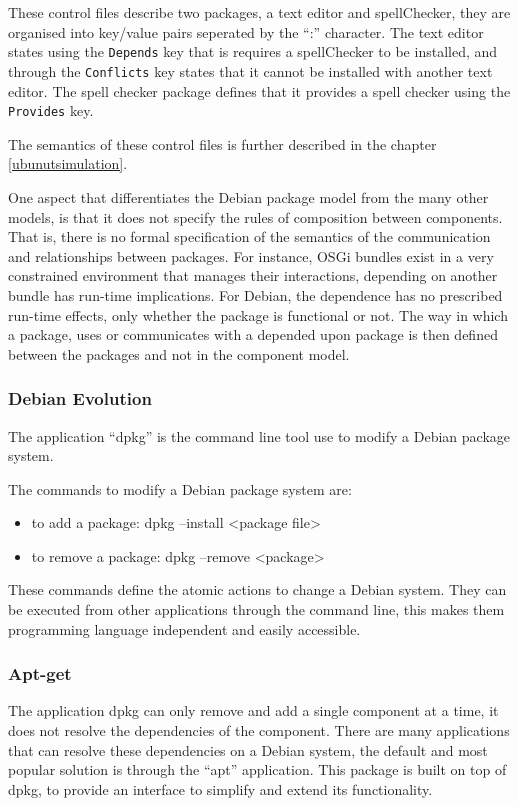 These control files describe two packages, a text editor and spellChecker, they are organised into key/value pairs seperated by the ``:'' character.
The text editor states using the \verb+Depends+ key that is requires a spellChecker to be installed, 
and through the \verb+Conflicts+ key states that it cannot be installed with another text editor.
The spell checker package defines that it provides a spell checker  using the \verb+Provides+ key.

The semantics of these control files is further described in the chapter \ref{ubunutsimulation}.

One aspect that differentiates the Debian package model from the many other models, is that it does not specify the rules of composition between components.
That is, there is no formal specification of the semantics of the communication and relationships between packages.
For instance, OSGi bundles exist in a very constrained environment that manages their interactions, depending on another bundle has run-time implications.
For Debian, the dependence has no prescribed run-time effects, only whether the package is functional or not.
The way in which a package, uses or communicates with a depended upon package is then defined between the packages and not in the component model.

\subsubsection{Debian Evolution}
The application ``dpkg'' is the command line tool use to modify a Debian package system.

The commands to modify a Debian package system are:
\begin{itemize}
  \item to add a package: dpkg --install <package file>
  \item to remove a package: dpkg --remove <package>
\end{itemize}

These commands define the atomic actions to change a Debian system.
They can be executed from other applications through the command line, this makes them programming language independent and easily accessible. 

\subsubsection{Apt-get}
The application dpkg can only remove and add a single component at a time, it does not resolve the dependencies of the component.
There are many applications that can resolve these dependencies on a Debian system, the default and most popular solution is through the ``apt'' application.
This package is built on top of dpkg, to provide an interface to simplify and extend its functionality.

